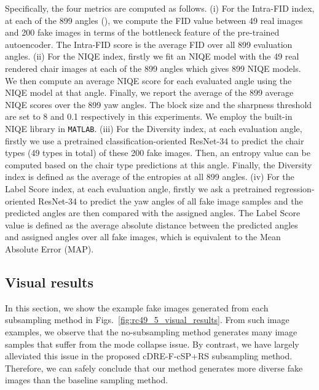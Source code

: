 \documentclass[10pt, twocolumn]{article}
\theoremstyle{definition}
\begin{document}
Specifically, the four metrics are computed as follows. (i) For the Intra-FID index, at each of the 899 angles (), we compute the FID \cite{heusel2017gans} value between 49 real images and 200 fake images in terms of the bottleneck feature of the pre-trained autoencoder. The Intra-FID score is the average FID over all 899 evaluation angles. (ii) For the NIQE index, firstly we fit an NIQE model with the 49 real rendered chair images at each of the 899 angles which gives 899 NIQE models. We then compute an average NIQE score for each evaluated angle using the NIQE model at that angle. Finally, we report the average of the 899 average NIQE scores over the 899 yaw angles. The block size and the sharpness threshold are set to 8 and 0.1 respectively in this experiments. We employ the built-in NIQE library in \texttt{MATLAB}. (iii) For the Diversity index, at each evaluation angle, firstly we use a pretrained classification-oriented ResNet-34 to predict the chair types (49 types in total) of these 200 fake images. Then, an entropy value can be computed based on the chair type predictions at this angle. Finally, the Diversity index is defined as the average of the entropies at all 899 angles. (iv) For the Label Score index, at each evaluation angle, firstly we ask a pretrained regression-oriented ResNet-34 to predict the yaw angles of all fake image samples and the predicted angles are then compared with the assigned angles. The Label Score value is defined as the average absolute distance between the predicted angles and assigned angles over all fake images, which is equivalent to the Mean Absolute Error (MAP).   




\subsection{Visual results}  \label{supp:details_of_rc49_visual_results}
In this section, we show the example fake images generated from each subsampling method in Figs.\ \ref{fig:rc49_5_visual_results}. From such image examples, we observe that the no-subsampling method generates many image samples that suffer from the mode collapse issue. By contrast, we have largely alleviated this issue in the proposed cDRE-F-cSP+RS subsampling method. Therefore, we can safely conclude that our method generates more diverse fake images than the baseline sampling method.    




\begin{figure*}[!htbp]
	\centering
	\\
	\quad
	\quad
	\caption{Example RC-49 images for angles from 4.5 degree to 85.5 degree (from top to bottom) in the SR-5 setting.}
	\label{fig:rc49_5_visual_results}
\end{figure*}
\end{document}
